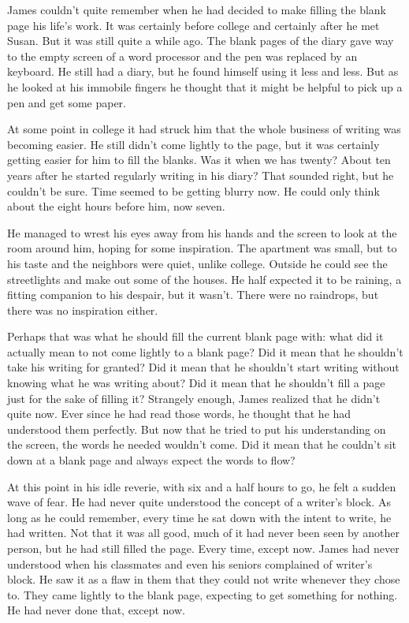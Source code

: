\documentclass[11pt,letterpaper]{article}
\begin{document}
James couldn't quite remember when he had decided to make filling the blank page his life's work. It was certainly before college and certainly after he met Susan. But it was still quite a while ago. The blank pages of the diary gave way to the empty screen of a word processor and the pen was replaced by an keyboard. He still had a diary, but he found himself using it less and less. But as he looked at his immobile fingers he thought that it might be helpful to pick up a pen and get some paper.

At some point in college it had struck him that the whole business of writing was becoming easier. He still didn't come lightly to the page, but it was certainly getting easier for him to fill the blanks. Was it when we has twenty? About ten years after he started regularly writing in his diary? That sounded right, but he couldn't be sure. Time seemed to be getting blurry now. He could only think about the eight hours before him, now seven.

He managed to wrest his eyes away from his hands and the screen to look at the room around him, hoping for some inspiration. The apartment was small, but to his taste and the neighbors were quiet, unlike college. Outside he could see the streetlights and make out some of the houses. He half expected it to be raining, a fitting companion to his despair, but it wasn't. There were no raindrops, but there was no inspiration either.

Perhaps that was what he should fill the current blank page with: what did it actually mean to not come lightly to a blank page? Did it mean that he shouldn't take his writing for granted? Did it mean that he shouldn't start writing without knowing what he was writing about? Did it mean that he shouldn't fill a page just for the sake of filling it? Strangely enough, James realized that he didn't quite now. Ever since he had read those words, he thought that he had understood them perfectly. But now that he tried to put his understanding on the screen, the words he needed wouldn't come. Did it mean that he couldn't sit down at a blank page and always expect the words to flow?

At this point in his idle reverie, with six and a half hours to go, he felt a sudden wave of fear. He had never quite understood the concept of a writer's block. As long as he could remember, every time he sat down with the intent to write, he had written. Not that it was all good, much of it had never been seen by another person, but he had still filled the page. Every time, except now. James had never understood when his classmates and even his seniors complained of writer's block. He saw it as a flaw in them that they could not write whenever they chose to. They came lightly to the blank page, expecting to get something for nothing. He had never done that, except now.
\end{document}
